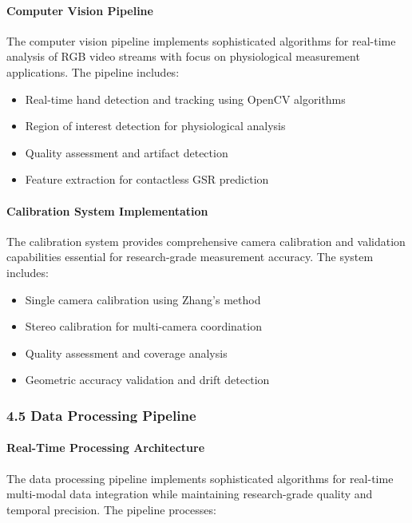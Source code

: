 \documentclass[12pt,a4paper]{report}
\begin{document}
\paragraph{Computer Vision Pipeline}

The computer vision pipeline implements sophisticated algorithms for real-time analysis of RGB video streams with focus
on physiological measurement applications. The pipeline includes:

\begin{itemize}
\item Real-time hand detection and tracking using OpenCV algorithms
\item Region of interest detection for physiological analysis
\item Quality assessment and artifact detection
\item Feature extraction for contactless GSR prediction

\end{itemize}
\paragraph{Calibration System Implementation}

The calibration system provides comprehensive camera calibration and validation capabilities essential for
research-grade measurement accuracy. The system includes:

\begin{itemize}
\item Single camera calibration using Zhang's method
\item Stereo calibration for multi-camera coordination
\item Quality assessment and coverage analysis
\item Geometric accuracy validation and drift detection

\end{itemize}
\subsubsection{4.5 Data Processing Pipeline}

\paragraph{Real-Time Processing Architecture}

The data processing pipeline implements sophisticated algorithms for real-time multi-modal data integration while
maintaining research-grade quality and temporal precision. The pipeline processes:
\end{document}
